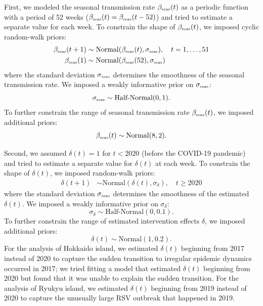 \documentclass[12pt]{article}
\newcommand{\tsub}[2]{#1_{{\textrm{\tiny #2}}}}
\begin{document}
First, we modeled the seasonal transmission rate $\tsub{\beta}{seas}(t)$ as a periodic function with a period of 52 weeks ($\tsub{\beta}{seas}(t) = \tsub{\beta}{seas}(t-52)$) and tried to estimate a separate value for each week.
To constrain the shape of $\tsub{\beta}{seas}(t)$, we imposed cyclic random-walk priors:
\begin{align}
\tsub{\beta}{seas}(t+1) &\sim \mathrm{Normal}(\tsub{\beta}{seas}(t), \tsub{\sigma}{seas}), \quad t=1,\dots,51  \\
\tsub{\beta}{seas}(1) &\sim \mathrm{Normal}(\tsub{\beta}{seas}(52), \tsub{\sigma}{seas})
\end{align}
where the standard deviation $\tsub{\sigma}{seas}$ determines the smoothness of the seasonal transmission rate.
We imposed a weakly informative prior on $\tsub{\sigma}{seas}$:
\begin{equation}
\tsub{\sigma}{seas} \sim \textrm{Half-Normal}(0, 1).
\end{equation}
To further constrain the range of seasonal transmission rate $\tsub{\beta}{seas}(t)$, we imposed additional priors:
\begin{equation}
\tsub{\beta}{seas}(t) \sim \mathrm{Normal}(8, 2).
\end{equation}

Second, we assumed $\delta(t) = 1$ for $t < 2020$ (before the COVID-19 pandemic) and tried to estimate a separate value for $\delta(t)$ at each week.
To constrain the shape of $\delta(t)$, we imposed random-walk priors:
\begin{align}
\delta(t+1) &\sim \mathrm{Normal}(\delta(t), \sigma_\delta), \quad t \geq 2020
\end{align}
where the standard deviation $\tsub{\sigma}{seas}$ determines the smoothness of the estimated $\delta(t)$.
We imposed a weakly informative prior on $\sigma_\delta$:
\begin{equation}
\sigma_\delta \sim \textrm{Half-Normal}(0, 0.1).
\end{equation}
To further constrain the range of estimated intervention effects $\delta$, we imposed additional priors:
\begin{equation}
\delta(t) \sim \mathrm{Normal}(1, 0.2).
\end{equation}
For the analysis of Hokkaido island, we estimated $\delta(t)$ beginning from 2017 instead of 2020 to capture the sudden transition to irregular epidemic dynamics occurred in 2017;
we tried fitting a model that estimated $\delta(t)$ beginning from 2020 but found that it was unable to explain the sudden transition.
For the analysis of Ryukyu island, we estimated $\delta(t)$ beginning from 2019 instead of 2020 to capture the unusually large RSV outbreak that happened in 2019.
\end{document}
